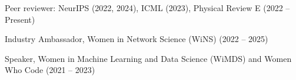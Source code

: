 \begin{zitemize}
\item Peer reviewer: NeurIPS (2022, 2024), ICML (2023), Physical Review E (2022 -- Present)
\item Industry Ambassador, Women in Network Science (WiNS) (2022 -- 2025)
\item Speaker, Women in Machine Learning and Data Science (WiMDS) and Women Who Code (2021 -- 2023)
\end{zitemize}

